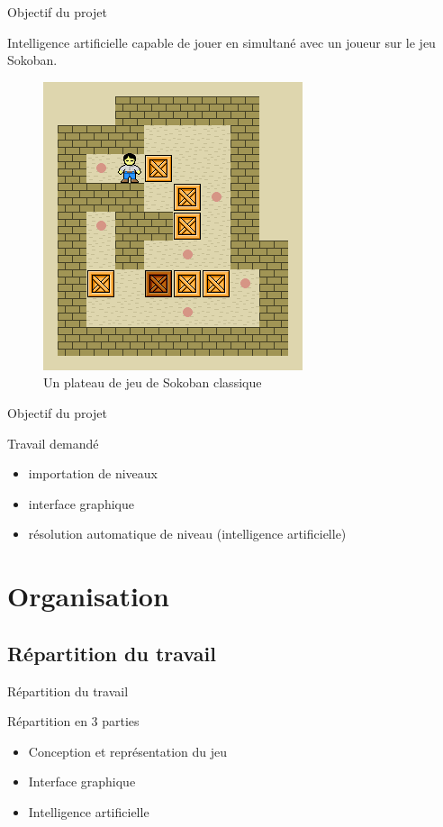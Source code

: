 \documentclass{beamer}
\begin{document}
\begin{frame}{Objectif du projet}
  \begin{center}
    Intelligence artificielle capable de jouer en simultané avec un joueur sur le jeu Sokoban.
    \vfill
    \begin{figure}
      \includegraphics[height=.4\textheight]{images/sokoban_example.png}
      \caption{Un plateau de jeu de Sokoban classique}
    \end{figure}
  \end{center}
\end{frame}

\begin{frame}{Objectif du projet}
  \begin{block}{Travail demandé}
    \begin{itemize}
      \item importation de niveaux
      \item interface graphique
      \item résolution automatique de niveau (intelligence artificielle)
    \end{itemize}
  \end{block}
\end{frame}

\section{Organisation}
\subsection{Répartition du travail}
\begin{frame}{Répartition du travail}
  \begin{block}{Répartition en 3 parties}
    \begin{itemize}
      \item Conception et représentation du jeu
      \item Interface graphique
      \item Intelligence artificielle
    \end{itemize}
  \end{block}
\end{frame}
\end{document}
